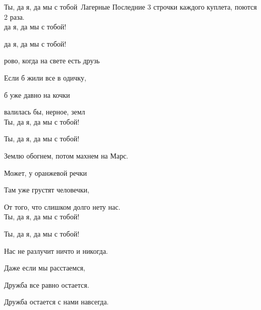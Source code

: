 \documentclass[11pt,a5paper]{book}
\begin{document}
\begin{song}{Ты, да я, да мы с тобой}{}{~}{Лагерные}{}{}
Последние 3 строчки каждого куплета, поются 2 раза.\\

 да я, да мы с тобой!\par
{} да я, да мы с тобой!\par
{}рово, когда на свете есть друзь\par
Если б жили все в одичку,\par
{} б уже давно на кочки\par
{}валилась бы, нерное, земл\\

Ты, да я, да мы с тобой!\par
Ты, да я, да мы с тобой!\par
Землю обогнем, потом махнем на Марс.\par
Может, у оранжевой речки\par
Там уже грустят человечки,\par
От того, что слишком долго нету нас.\\

Ты, да я, да мы с тобой!\par
Ты, да я, да мы с тобой!\par
Нас не разлучит ничто и никогда.\par
Даже если мы расстаемся,\par
Дружба все равно остается.\par
Дружба остается с нами навсегда.\par
\end{song}
\end{document}

